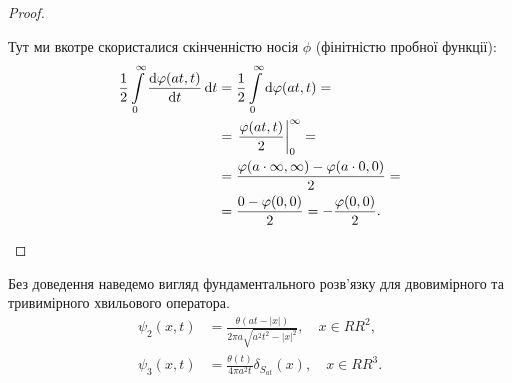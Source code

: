 \begin{proof}
	\begin{remark}
		Тут ми вкотре скористалися скінченністю носія $\phi$ (фінітністю пробної функції):
		\begin{equation}
			\begin{aligned}
				\frac{1}{2} \displaystyle\int\limits_0^\infty \frac{\mathop{}\!\mathrm{d} \varphi(at, t)}{\mathop{}\!\mathrm{d} t} \mathop{}\!\mathrm{d} t &= \frac{1}{2} \displaystyle\int\limits_0^\infty \mathop{}\!\mathrm{d} \varphi(at, t) = \\
				&= \left. \frac{\varphi(a t, t)}{2} \right|_0^\infty = \\
				&= \frac{\varphi(a \cdot \infty, \infty) - \varphi(a \cdot 0, 0)}{2} = \\
				&= \frac{0 - \varphi(0, 0)}{2} = - \frac{\varphi(0, 0)}{2}.
			\end{aligned}
		\end{equation}
	\end{remark}
\end{proof}

\begin{remark}
	Без доведення наведемо вигляд фундаментального розв'язку для двовимірного та тривимірного хвильового оператора.
	\begin{align}
		\psi_2(x, t) &= \frac{\theta(at-|x|)}{2\pi a\sqrt{a^2t^2-|x|^2}}, \quad x \in RR^2, \\
		\psi_3(x, t) &= \frac{\theta(t)}{4 \pi a^2 t} \delta_{S_{at}}(x), \quad x \in RR^3.
	\end{align}
\end{remark}

